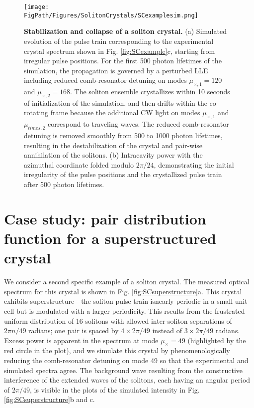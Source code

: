 \begin{figure}[htpb]
	\begin{center}
		\texttt{[image: \\FigPath/Figures/SolitonCrystals/SCexamplesim.png]}
	\end{center}
	\caption[Stabilization and collapse of a soliton crystal]{\textbf{Stabilization and collapse of a soliton crystal.} (a) Simulated evolution of the pulse train corresponding to the experimental crystal spectrum shown in Fig. \ref{fig:SCexample}c, starting from irregular pulse positions. For the first 500 photon lifetimes of the simulation, the propagation is governed by a perturbed LLE including reduced comb-resonator detuning on modes $\mu_{\times,1}=120$ and $\mu_{\times,2}=168$. The soliton ensemble crystallizes within 10 seconds of initialization of the simulation, and then drifts within the co-rotating frame because the additional CW light on modes $\mu_{\times,1}$ and $\mu_{times,2}$ correspond to traveling waves. The reduced comb-resonator detuning is removed smoothly from 500 to 1000 photon lifetimes, resulting in the destabilization of the crystal and pair-wise annihilation of the solitons. (b) Intracavity power with the azimuthal coordinate folded modulo $2\pi/24$, demonstrating the initial irregularity of the pulse positions and the crystallized pulse train after 500 photon lifetimes.}
	\label{fig:SCexamplesim}
\end{figure} 


\section{Case study: pair distribution function for a superstructured crystal}

We consider a second specific example of a soliton crystal. The measured optical spectrum for this crystal is shown in Fig. \ref{fig:SCsuperstructure}a. This crystal exhibits superstructure---the soliton pulse train isnearly periodic in a small unit cell but is modulated with a larger periodicity. This rseults from the frustrated uniform distribution of 16 solitons with allowed inter-soliton separations of $2\pi n/49$ radians; one pair is spaced by $4 \times 2\pi/49$ instead of $3 \times 2\pi/49$ radians.  Excess power is apparent in the spectrum at mode $\mu_\times=49$ (highlighted by the red circle in the plot), and we simulate this crystal by phenomenologically reducing the comb-resonator detuning on mode 49 so that the experimental and simulated spectra agree. The background wave resulting from the constructive interference of the extended waves of the solitons, each having an angular period of $2\pi/49$, is visible in the plots of the simulated intensity in Fig. \ref{fig:SCsuperstructure}b and c.

